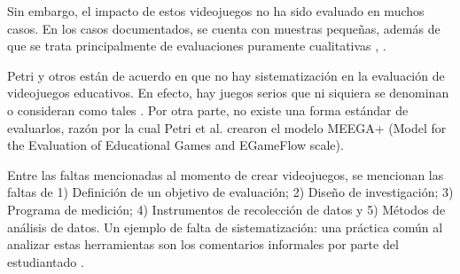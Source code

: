 Sin embargo, el impacto de estos videojuegos no ha sido evaluado en muchos casos. En los casos documentados, se cuenta con muestras pequeñas, además de que se trata principalmente de evaluaciones puramente cualitativas \cite{video_game_foster_computational_thinking}, \cite{effectiveness_gbl}.

Petri y otros \cite{meegaplus} están de acuerdo en que no hay sistematización en la evaluación de videojuegos educativos. En efecto, hay juegos serios que ni siquiera se denominan o consideran como tales \cite{evaluation_of_games_for_teaching_cs}. Por otra parte, no existe una forma estándar de evaluarlos, razón por la cual Petri et al. \cite{meegaplus} crearon el modelo MEEGA+ (Model for the Evaluation of Educational Games and EGameFlow scale).

Entre las faltas mencionadas al momento de crear videojuegos, se mencionan las faltas de 1) Definición de un objetivo de evaluación; 2) Diseño de investigación; 3) Programa de medición; 4) Instrumentos de recolección de datos y 5) Métodos de análisis de datos. Un ejemplo de falta de sistematización: una práctica común al analizar estas herramientas son los comentarios informales por parte del estudiantado \cite{meegaplus}.





